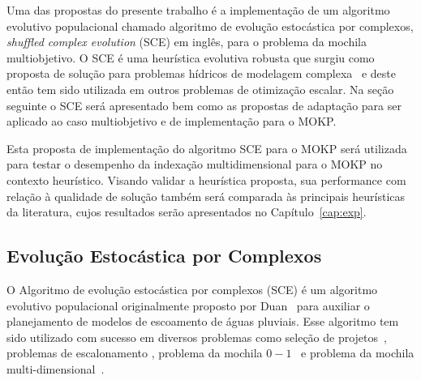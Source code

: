 
Uma das propostas do presente trabalho é a implementação de um algoritmo evolutivo
populacional chamado algoritmo de evolução estocástica por complexos,
\emph{shuffled complex evolution} (SCE) em inglês,
para o problema da mochila multiobjetivo.
O SCE é uma heurística evolutiva robusta que surgiu como proposta
de solução para problemas hídricos de modelagem complexa~\cite{duan1992effective} e
deste então tem sido utilizada em outros problemas de otimização escalar.
Na seção seguinte o SCE será apresentado bem como as propostas de adaptação para ser aplicado ao
caso multiobjetivo e de implementação para o MOKP.

Esta proposta de implementação do algoritmo SCE para o MOKP será utilizada para testar o
desempenho da indexação multidimensional para o MOKP no contexto heurístico.
Visando validar a heurística proposta, sua performance com relação à qualidade de solução
também será comparada às principais heurísticas da literatura, cujos resultados serão
apresentados no Capítulo~\ref{cap:exp}.

\subsection{Evolução Estocástica por Complexos}

O Algoritmo de evolução estocástica por complexos (SCE)
é um algoritmo evolutivo populacional originalmente proposto por Duan~\cite{duan1992effective}
para auxiliar o planejamento de modelos de escoamento de águas pluviais.
Esse algoritmo tem sido utilizado com sucesso em diversos problemas como
seleção de projetos~\cite{elbeltagi2007modified},
problemas de escalonamento \cite{zhao2015shuffled},
problema da mochila $0-1$~\cite{bhattacharjee2014shuffled} e
problema da mochila multi-dimensional~\cite{baroni2015shuffled,baroni2016shuffled}.

